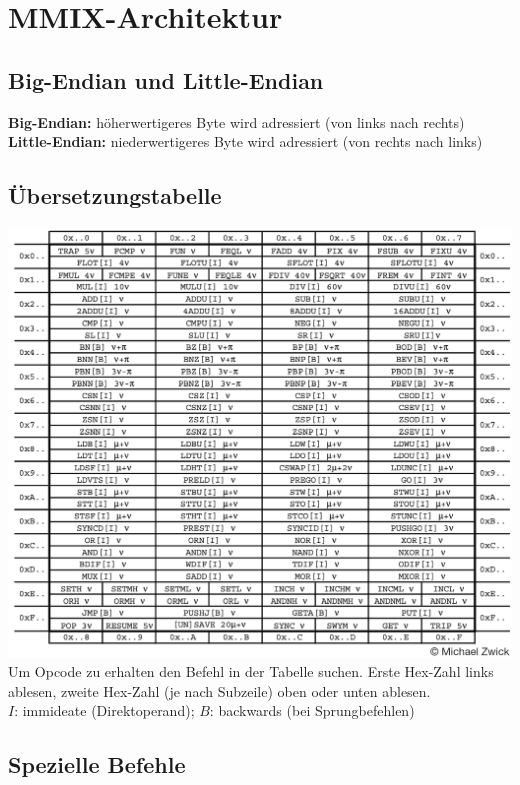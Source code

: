 \documentclass[german, threecolumn, 8pt]{latex4ei/latex4ei_sheet}
\begin{document}
\begin{minipage}{\columnwidth}
\section{MMIX-Architektur}
\subsection{Big-Endian und Little-Endian}
\textbf{Big-Endian:} höherwertigeres Byte wird adressiert (von links nach rechts)\\
\textbf{Little-Endian:} niederwertigeres Byte wird adressiert (von rechts nach links)\\
\begin{sectionbox}
\subsection{Übersetzungstabelle}
\includegraphics[width=\linewidth]{img/Uebersetzungstabelle.png}
Um Opcode zu erhalten den Befehl in der Tabelle suchen. Erste Hex-Zahl links ablesen, zweite Hex-Zahl (je nach Subzeile) oben oder unten ablesen.\\
$I$: immideate (Direktoperand); $B$: backwards (bei Sprungbefehlen)
\end{sectionbox}
\end{minipage}
\subsection{Spezielle Befehle}
\end{document}
